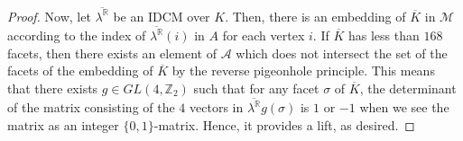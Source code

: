 \documentclass[10pt,a4paper]{amsart}
\newcommand{\R}{\mathbb{R}}
\newcommand{\Z}{\mathbb{Z}}
\newcommand{\cA}{\mathcal{A}}
\newcommand{\cM}{\mathcal{M}}
\begin{document}
\begin{proof}
Now, let $\overline{\lambda^\R}$ be an IDCM over $K$.
    Then, there is an embedding of $\overline{K}$ in $\cM$ according to the index of $\overline{\lambda^\R}(i)$ in $A$ for each vertex $i$.
    If $\overline{K}$ has less than $168$ facets, then there exists an element of $\cA$ which does not intersect the set of the facets of the embedding of $\overline{K}$ by the reverse pigeonhole principle.
    This means that there exists $g \in GL(4, \Z_2)$ such that for any facet $\sigma$ of $\overline{K}$, the determinant of the matrix consisting of the $4$ vectors in $\overline{\lambda^\R} g(\sigma)$ is $1$ or $-1$ when we see the matrix as an integer $\{0, 1\}$-matrix.
    Hence, it provides a lift, as desired.
\end{proof}
\end{document}
